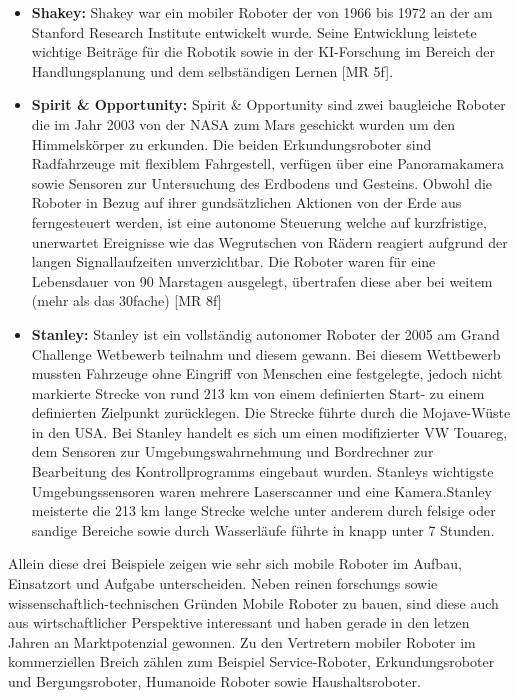 \begin{itemize}
	\item{\textbf{Shakey:}} Shakey war ein mobiler Roboter der von 1966 bis 1972 an der am Stanford Research Institute entwickelt wurde. Seine Entwicklung leistete wichtige Beiträge für die Robotik sowie in der KI-Forschung im Bereich der Handlungsplanung und dem selbständigen Lernen [MR 5f].
	\item{\textbf{Spirit \& Opportunity:}} Spirit \& Opportunity sind zwei baugleiche Roboter die im Jahr 2003 von der NASA zum Mars geschickt wurden um den Himmelskörper zu erkunden. Die beiden Erkundungsroboter sind Radfahrzeuge mit flexiblem Fahrgestell, verfügen über eine Panoramakamera sowie Sensoren zur Untersuchung des Erdbodens und Gesteins. Obwohl die Roboter in Bezug auf ihrer gundsätzlichen Aktionen von der Erde aus ferngesteuert werden, ist eine autonome Steuerung welche auf kurzfristige, unerwartet Ereignisse wie das Wegrutschen von Rädern reagiert aufgrund der langen Signallaufzeiten unverzichtbar. Die Roboter waren für eine
	Lebensdauer von 90 Marstagen ausgelegt, übertrafen diese aber bei weitem (mehr als das 30fache) [MR 8f]
	\item{\textbf{Stanley:}} Stanley ist ein vollständig autonomer Roboter der 2005 am Grand Challenge Wetbewerb teilnahm und diesem gewann. Bei diesem Wettbewerb mussten Fahrzeuge ohne Eingriff von Menschen eine festgelegte, jedoch nicht markierte Strecke von rund 213 km von einem definierten Start- zu einem definierten Zielpunkt zurücklegen. Die Strecke führte durch 
	die Mojave-Wüste in den USA. Bei Stanley handelt es sich um einen modifizierter VW Touareg, dem Sensoren zur Umgebungswahrnehmung und Bordrechner zur Bearbeitung des Kontrollprogramms eingebaut wurden. Stanleys wichtigste Umgebungssensoren waren mehrere Laserscanner und eine Kamera.Stanley meisterte die 213 km lange Strecke welche unter anderem durch felsige
	oder sandige Bereiche sowie durch Wasserläufe führte in knapp unter 7 Stunden.
\end{itemize}
Allein diese drei Beispiele zeigen wie sehr sich mobile Roboter im Aufbau, Einsatzort und Aufgabe unterscheiden. Neben reinen forschungs sowie wissenschaftlich-technischen Gründen Mobile Roboter zu bauen, sind diese auch aus wirtschaftlicher Perspektive interessant und haben gerade in den letzen Jahren an Marktpotenzial gewonnen.
\newline
Zu den Vertretern mobiler Roboter im kommerziellen Breich zählen zum Beispiel Service-Roboter, Erkundungsroboter und Bergungsroboter, Humanoide Roboter sowie Haushaltsroboter.
